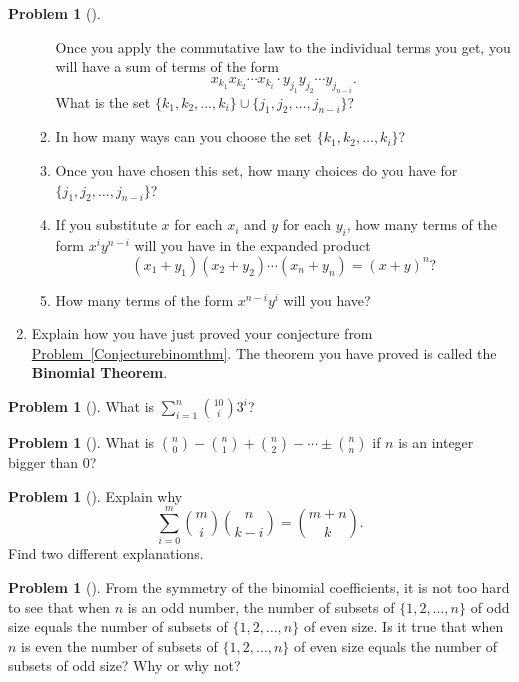 \documentclass[10pt,]{book}
\newcommand{\terminology}[1]{\textbf{#1}}
\theoremstyle{plain}
\theoremstyle{definition}
\newtheorem{activity}[project]{Problem}
\theoremstyle{definition}
\numberwithin{equation}{chapter}
\newcommand{\importantarrow}{\Rightarrow}
\begin{document}
\begin{activity}[]
\begin{enumerate}[font=\bfseries,label=(\alph*),ref=\alph*]
\begin{enumerate}[font=\bfseries,label=(\roman*),ref=\theenumi.\roman*]
Once you apply the commutative law to the individual terms you get, you will have a sum of terms of the form%
\begin{equation*}
x_{k_1}x_{k_2}\cdots x_{k_i}\cdot y_{j_1}y_{j_2}\cdots
y_{j_{n-i}}.
\end{equation*}
What is the set \(\{k_1,k_2,\ldots, k_i\}\cup \{j_1,j_2,\ldots, j_{n-i}\}\)?%
\item\label{task-70} \marginsymbol[-2.5em]{} In how many ways can you choose the set \(\{k_1,k_2,\ldots, k_i\}\)?%
\item\label{task-71} \marginsymbol[-2.5em]{} Once you have chosen this set, how many choices do you have for \(\{j_1,j_2,\ldots, j_{n-i}\}\)?%
\item\label{task-72} \marginsymbol[-2.5em]{} If you substitute \(x\) for each \(x_i\) and \(y\) for each \(y_i\), how many terms of the form \(x^iy^{n-i}\) will you have in the expanded product%
\begin{equation*}
(x_1+y_1)(x_2+y_2)\cdots (x_n+y_n)=(x+y)^n?
\end{equation*}
%
\item\label{task-73} \marginsymbol[-2.5em]{} How many terms of the form \(x^{n-i}y^i\) will you have?%
\end{enumerate}
\item\label{bin-thm-concl} \marginsymbol[-2.5em]{} Explain how you have just proved your conjecture from \hyperref[Conjecturebinomthm]{Problem~\ref{Conjecturebinomthm}}.  The theorem you have proved is called the \terminology{Binomial Theorem}.%
\end{enumerate}
\end{activity}
\begin{activity}[]\marginsymbol[-1em]{} \label{activity-55}
What is \(\sum_{i=1}^n \binom{10}{i}3^i\)?%
\end{activity}
\begin{activity}[]\marginsymbol[-1em]{} \label{activity-56}
What is \(\binom{n}{0}-\binom{n}{1}+\binom{n}{2}-\cdots \pm
\binom{n}{n}\) if \(n\) is an integer bigger than 0?%
\end{activity}
\begin{activity}[]\marginsymbol[-1em]{} \label{activity-57}
Explain why%
\begin{equation*}
\sum_{i=0}^m\binom{m}{i}\binom{n}{k-i} = \binom{m+n}{k}.
\end{equation*}
Find two different explanations.%
\end{activity}
\begin{activity}[]\marginsymbol[-1em]{\pdftooltip{$\importantarrow$}{especially interesting}} \label{activity-58}
From the symmetry of the binomial coefficients, it is not too hard to see that when \(n\) is an odd number, the number of subsets of \(\{1,2,\ldots,n\}\) of odd size equals the number of subsets of \(\{1,2,\ldots,n\}\) of even size. Is it true that when \(n\) is even the number of subsets of \(\{1,2,\ldots,n\}\) of even size equals the number of subsets of odd size? Why or why not?%
\end{activity}
\end{document}
